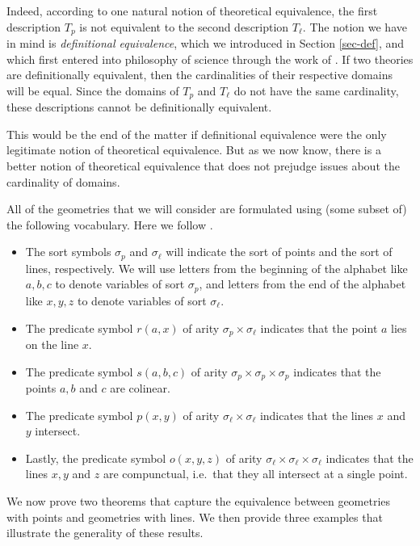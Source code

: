Indeed, according to one natural notion of theoretical equivalence,
the first description $T_p$ is not equivalent to the second
description $T_\ell$.  The notion we have in mind is
\emph{definitional equivalence}, which we introduced in Section
\ref{sec-def}, and which first entered into philosophy of science
through the work of \cite{glymour1970,glymour1977,glymour1980}.  If
two theories are definitionally equivalent, then the cardinalities of
their respective domains will be equal.  Since the domains of $T_p$
and $T_\ell$ do not have the same cardinality, these descriptions
cannot be definitionally equivalent.

This would be the end of the matter if definitional equivalence were
the only legitimate notion of theoretical equivalence.  But as we now
know, there is a better notion of theoretical equivalence that does
not prejudge issues about the cardinality of domains.

All of the geometries that we will consider are formulated using (some
subset of) the following vocabulary.  Here we follow
\cite{schwabhauser1983}.
\begin{itemize}
\item The sort symbols $\sigma_p$ and $\sigma_\ell$ will indicate the
  sort of points and the sort of lines, respectively. We will use
  letters from the beginning of the alphabet like $a,b,c$ to denote
  variables of sort $\sigma_p$, and letters from the end of the
  alphabet like $x, y, z$ to denote variables of sort $\sigma_\ell$.
\item The predicate symbol $r(a,x)$ of arity
  $\sigma_p\times\sigma_\ell$ indicates that the point $a$ lies on the
  line $x$.
\item The predicate symbol $s(a,b,c)$ of arity
  $\sigma_p\times\sigma_p\times\sigma_p$ indicates that the points
  $a,b$ and $c$ are colinear.
\item The predicate symbol $p(x,y)$ of arity
  $\sigma_\ell\times\sigma_\ell$ indicates that the lines $x$ and $y$
  intersect.
\item Lastly, the predicate symbol $o(x,y,z)$ of arity
  $\sigma_\ell\times\sigma_\ell\times\sigma_\ell$ indicates that the
  lines $x,y$ and $z$ are compunctual, i.e.~that they all intersect at
  a single point.
\end{itemize}

We now prove two theorems that capture the equivalence between
geometries with points and geometries with lines. We then provide
three examples that illustrate the generality of these results.

